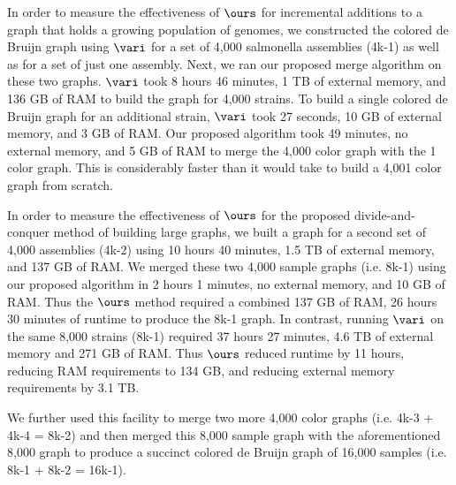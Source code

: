 In order to measure the effectiveness of $\ours$ for incremental additions to a graph that holds a growing population of genomes, we constructed the colored de Bruijn graph using $\vari$ for a set of 4,000 salmonella assemblies (4k-1) as well as for a set of just one assembly.  Next, we ran our proposed merge algorithm on these two graphs.  $\vari$ took 8 hours 46 minutes, 1 TB of external memory, and 136 GB of RAM to build the graph for 4,000 strains.  To build a single colored de Bruijn graph for an additional strain, $\vari$ took 27 seconds, 10 GB of external memory, and 3 GB of RAM.  Our proposed  algorithm took 49 minutes, no external memory, and 5 GB of RAM to merge the 4,000 color graph with the 1 color graph. This is considerably faster than it would take to build a 4,001 color graph from scratch.  %

In order to measure the effectiveness of $\ours$ for the proposed divide-and-conquer method of building large graphs, we built a graph for a second set of 4,000 assemblies (4k-2) using 10 hours 40 minutes, 1.5 TB of external memory, and 137 GB of RAM.  We merged these two 4,000 sample graphs (i.e. 8k-1) using our proposed algorithm in 2 hours 1 minutes, no external memory, and 10 GB of RAM.  Thus the $\ours$ method required a combined 137 GB of RAM, 26 hours 30 minutes of runtime to produce the 8k-1 graph.   In contrast, running $\vari$ on the same 8,000 strains (8k-1) required 37 hours 27 minutes, 4.6 TB of external memory and 271 GB of RAM. Thus $\ours$ reduced runtime by 11 hours, reducing RAM requirements to 134 GB, and reducing external memory requirements by 3.1 TB.

We further used this facility to merge two more 4,000 color graphs (i.e. 4k-3 + 4k-4 = 8k-2) and then merged this 8,000 sample graph with the aforementioned 8,000 graph to produce a succinct colored de Bruijn graph of 16,000 samples (i.e. 8k-1 + 8k-2 = 16k-1).  

